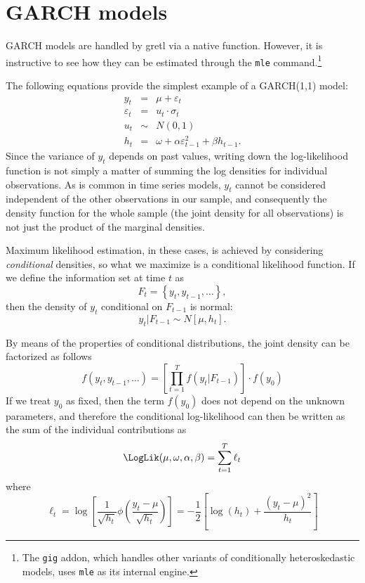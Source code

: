 \section{GARCH models}
\label{sec:garch}

GARCH models are handled by gretl via a native function. However, it is
instructive to see how they can be estimated through the \texttt{mle}
command.\footnote{The \texttt{gig} addon, which handles other variants
of conditionally heteroskedastic models, uses \texttt{mle} as its
internal engine.}

The following equations provide the simplest example of a GARCH(1,1)
model:
\begin{eqnarray*}
  y_t & = & \mu + \varepsilon_t \\
  \varepsilon_t & = & u_t \cdot \sigma_t \\
  u_t & \sim & N(0,1) \\
  h_t & = & \omega + \alpha \varepsilon^2_{t-1} + \beta h_{t-1}.
\end{eqnarray*}
Since the variance of $y_t$ depends on past values, writing down the
log-likelihood function is not simply a matter of summing the log
densities for individual observations. As is common in time series
models, $y_t$ cannot be considered independent of the other
observations in our sample, and consequently the density function for
the whole sample (the joint density for all observations) is not just
the product of the marginal densities.

Maximum likelihood estimation, in these cases, is achieved by
considering \emph{conditional} densities, so what we maximize is a
conditional likelihood function. If we define the information set at
time $t$ as
\[
  F_t = \left\{ y_t, y_{t-1}, \ldots \right\} ,
\]
then the density of $y_t$ conditional on $F_{t-1}$ is normal:
\[
  y_t | F_{t-1} \sim N\left[ \mu, h_{t} \right].
\]

By means of the properties of conditional distributions, the joint
density can be factorized as follows
\[
  f(y_t, y_{t-1}, \ldots) = \left[ \prod_{t=1}^T f(y_t |F_{t-1})
  \right] \cdot f(y_0)
\]
If we treat $y_0$ as fixed, then the term $f(y_0)$ does not depend on
the unknown parameters, and therefore the conditional log-likelihood
can then be written as the sum of the individual contributions as
\begin{equation}
  \label{eq:garchloglik}
  \LogLik(\mu,\omega,\alpha,\beta) = \sum_{t=1}^T \ell_t
\end{equation}
where 
\[
  \ell_t = \log \left[ \frac{1}{\sqrt{h_t}} \phi\left( \frac{y_t - \mu}{\sqrt{h_t}}
    \right) \right] = 
    - \frac{1}{2} \left[ \log(h_t) + \frac{(y_t - \mu)^2}{h_t} \right]
\]

